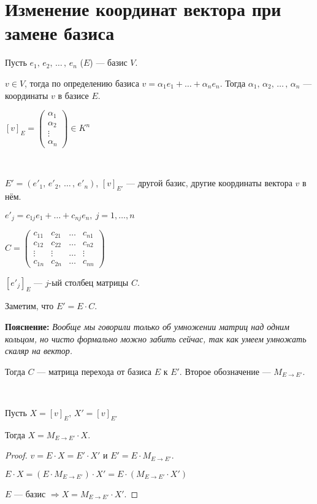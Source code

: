\section{Изменение координат вектора при замене базиса}

\begin{conj} 
    
    Пусть $e_1,\, e_2,\, \dots\, ,\, e_n$ ($E$) --- базис $V$. 
    
    $v \in V$, тогда по определению базиса $v = \alpha_1 e_1 + \dots + \alpha_n e_n$. 
    Тогда $\alpha_1,\, \alpha_2,\, \dots\, ,\, \alpha_n$ --- координаты $v$ в базисе $E$.

    $[v]_E =
        \begin{pmatrix}
            \alpha_1\\
            \alpha_2\\
            \vdots\\
            \alpha_n
        \end{pmatrix}
    \in K^n$
\end{conj}
\
\begin{conj}


    $E' = (e'_1,\, e'_2,\, \dots\, ,\, e'_n)$, $[v]_{E'}$ --- другой базис, другие координаты вектора $v$ в нём.

    $e'_j = c_{1j}e_1 + \dots + c_{nj}e_n,\ j = 1, \dots, n$

    $C =
        \begin{pmatrix}
            c_{11} & c_{21} & \dots & c_{n1} \\
            c_{12} & c_{22} & \dots & c_{n2} \\
            \vdots & \vdots & \dots & \vdots \\
            c_{1n} & c_{2n} & \dots & c_{nn}
        \end{pmatrix}
    $

    $[e'_j]_E$ --- $j$-ый столбец матрицы $C$.

    Заметим, что $E' = E \cdot C$.


    \textbf{Пояснение:}
    \emph{Вообще мы говорили только об умножении матриц над одним кольцом, но чисто формально можно забить сейчас, так как умеем умножать скаляр на вектор.}

    Тогда $C$ --- матрица перехода от базиса $E$ к $E'$. Второе обозначение --- $M_{E \to E'}$.


\end{conj}
\
\begin{theorem-non} 
    
    Пусть $X = [v]_E,\, X' = [v]_{E'}$

    Тогда $X = M_{E \to E'} \cdot X$.
    \begin{proof}
        
        $v = E \cdot X = E' \cdot X'$ и $E' = E \cdot M_{E \to E'}$.

        $E \cdot X = (E \cdot M_{E \to E'}) \cdot X' = E \cdot (M_{E \to E'} \cdot X')$

        $E$ --- базис $\Longrightarrow X = M_{E \to E'} \cdot X'$.

    \end{proof}
\end{theorem-non}




